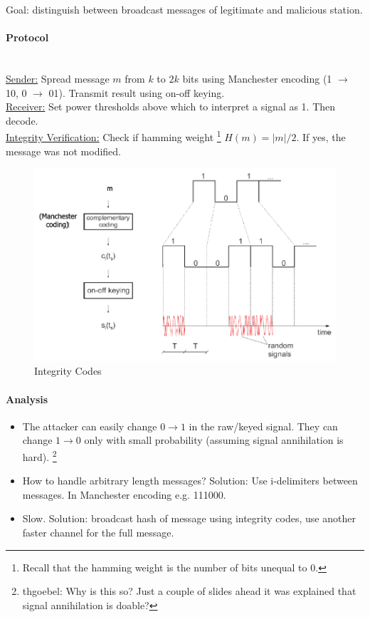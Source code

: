 Goal: distinguish between broadcast messages of legitimate and malicious station.

\paragraph{Protocol} \mbox{}\\
\underline{Sender:}
Spread message $m$ from $k$ to $2k$ bits using Manchester encoding (1 $\rightarrow$ 10, 0 $\rightarrow$ 01).
Transmit result using on-off keying.
\\
\underline{Receiver:}
Set power thresholds above which to interpret a signal as 1. Then decode.
\\
\underline{Integrity Verification:}
Check if hamming weight%
\footnote{Recall that the hamming weight is the number of bits unequal to 0.}
$H(m)=|m|/2$. If yes, the message was not modified.

\begin{figure}
	\centering
	\includegraphics[scale=0.4]{images/7-integrity-code.png}
	\caption{Integrity Codes}
	\label{fig:integrity-code}
\end{figure}

\paragraph{Analysis}
\begin{itemize}
	\item The attacker can easily change $0 \rightarrow 1$ in the raw/keyed signal.
	They can change $1 \rightarrow 0$ only with small probability (assuming signal annihilation is hard).%
	\footnote{thgoebel: Why is this so? Just a couple of slides ahead it was explained that signal annihilation is doable?}
	\item How to handle arbitrary length messages?
	Solution: Use i-delimiters between messages. In Manchester encoding e.g. 111000.
	\item Slow. Solution: broadcast hash of message using integrity codes, use another faster channel for the full message.
\end{itemize}

